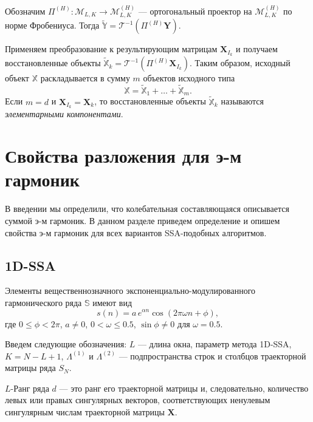 \documentclass[specialist,
               substylefile = spbu.rtx,
               subf,href,colorlinks=true, 12pt]{disser}
\begin{document}
Обозначим $\Pi^{(H)}: \mathcal{M}_{L,K} \rightarrow \mathcal{M}_{L,K}^{(H)}$ --- ортогональный проектор на $\mathcal{M}_{L,K}^{(H)}$ по норме Фробениуса. Тогда $\widetilde{\mathbb{Y}} = \mathcal{T}^{-1}\left( \Pi^{(H)} \mathbf{Y}\right)$.

Применяем преобразование к результирующим матрицам $\mathbf{X}_{I_k}$ и получаем восстановленные объекты $\widetilde{\mathbb{X}}_k =\mathcal{T}^{-1}\left( \Pi^{(H)} \mathbf{X}_{I_k}\right)$. Таким образом, исходный объект $\mathbb{X}$ раскладывается в сумму $m$ объектов исходного типа
\begin{equation*}
\mathbb{X} = \widetilde{\mathbb{X}}_1 + \ldots + \widetilde{\mathbb{X}}_m.
\end{equation*}
Если $m = d$ и $\mathbf{X}_{I_k} = \mathbf{X}_k$, то восстановленные объекты $\widetilde{\mathbb{X}}_k$ называются \textit{элементарными компонентами}.

\section{Свойства разложения для э-м гармоник}
В введении мы определили, что колебательная составляющаяся описывается суммой э-м гармоник. В данном разделе приведем определение и опишем свойства э-м гармоник для всех вариантов SSA-подобных алгоритмов.

\subsection{1D-SSA}
\label{sec:1d_ssa_theory}

Элементы вещественнозначного экспоненциально-модулированного гармонического ряда $\mathbb{S}$ имеют вид
\begin{equation} \label{eq:ex_mod_garm_1d}
 s(n) = a\, e^{\alpha n} \cos(2\pi\omega n + \phi),
\end{equation}
где $0 \leqslant \phi < 2\pi$, $a \not = 0$, $0<\omega \leqslant 0.5$, $\sin \phi \not = 0$ для $\omega = 0.5$.

Введем следующие обозначения: $L$ --- длина окна, параметр метода 1D-SSA, $K=N-L+1$, $\Lambda^{(1)}$ и $\Lambda^{(2)}$ --- подпространства строк и столбцов траекторной матрицы ряда $S_N$.

$L$-Ранг ряда $d$ --- это ранг его траекторной матрицы и, следовательно, количество левых или правых сингулярных векторов, соответствующих ненулевым сингулярным числам траекторной матрицы $\mathbf{X}$.

\end{document}
